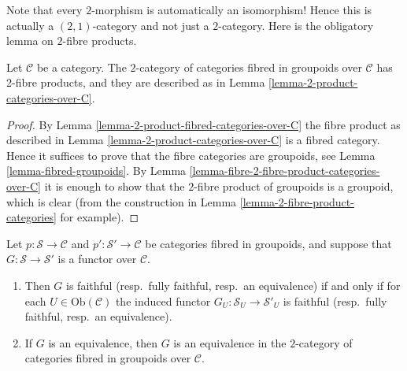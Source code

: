 \noindent
Note that every $2$-morphism is automatically an isomorphism!
Hence this is actually a $(2, 1)$-category and not just a
$2$-category. Here is the obligatory lemma on $2$-fibre products.

\begin{lemma}
\label{lemma-2-product-fibred-categories}
Let $\mathcal{C}$ be a category.
The $2$-category of categories fibred in groupoids
over $\mathcal{C}$ has 2-fibre products, and they are described as in
Lemma \ref{lemma-2-product-categories-over-C}.
\end{lemma}

\begin{proof}
By Lemma \ref{lemma-2-product-fibred-categories-over-C}
the fibre product as described in
Lemma \ref{lemma-2-product-categories-over-C} is a fibred category.
Hence it suffices to prove that the fibre categories are
groupoids, see Lemma \ref{lemma-fibred-groupoids}.
By Lemma \ref{lemma-fibre-2-fibre-product-categories-over-C}
it is enough to show that the $2$-fibre product of groupoids
is a groupoid, which is clear (from the construction in
Lemma \ref{lemma-2-fibre-product-categories} for example).
\end{proof}

\begin{lemma}
\label{lemma-equivalence-fibred-categories}
Let $p : \mathcal{S}\to \mathcal{C}$ and
$p' : \mathcal{S'}\to \mathcal{C}$ be categories fibred in groupoids, and
suppose that $G : \mathcal{S}\to \mathcal {S}'$ is a functor over
$\mathcal{C}$.
\begin{enumerate}
\item Then $G$ is faithful (resp.\ fully faithful, resp.\ an equivalence)
if and only if for each $U\in\text{Ob}(\mathcal{C})$ the induced functor
$G_U : \mathcal{S}_U\to \mathcal{S}'_U$ is faithful
(resp.\ fully faithful, resp.\ an equivalence).
\item If $G$ is an equivalence, then $G$ is an equivalence in the
$2$-category of categories fibred in groupoids over $\mathcal{C}$.
\end{enumerate}
\end{lemma}

